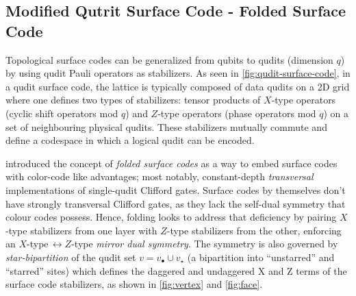 \subsection{Modified Qutrit Surface Code - Folded Surface Code}\label{sec: qudit surface code}

Topological surface codes can be generalized from qubits to qudits (dimension $q$) by using qudit Pauli operators as stabilizers. As seen in \autoref{fig:qudit-surface-code}, in a qudit surface code, the lattice is typically composed of data qudits on a 2D grid where one defines two types of stabilizers: tensor products of $X$-type operators (cyclic shift operators mod $q$) and $Z$-type operators (phase operators mod $q$) on a set of neighbouring physical qudits. These stabilizers mutually commute and define a codespace in which a logical qudit can be encoded. 


\cite{Moussa2016} introduced the concept of \emph{folded surface codes} as a way to embed surface codes with color-code like advantages; most notably, constant-depth \emph{transversal} implementations of single-qudit Clifford gates. Surface codes by themselves don't have strongly transversal Clifford gates, as they lack the self-dual symmetry that colour codes possess. Hence, folding looks to address that deficiency by pairing $X$-type stabilizers from one layer with $Z$-type stabilizers from the other, enforcing an
$X$-type$ \,\leftrightarrow\! Z$-type \emph{mirror dual symmetry}. The symmetry is also governed by \emph{star-bipartition} of the qudit set $v=v_\bullet\cup v_\star$ (a bipartition into “unstarred” and
“starred” sites) which defines the daggered and undaggered X and Z terms of the surface code stabilizers, as shown in \autoref{fig:vertex} and \autoref{fig:face}. 

